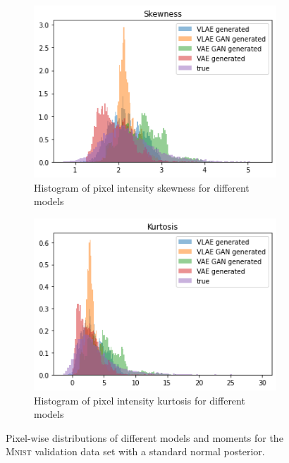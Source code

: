 \begin{figure}
    \hfill
    \begin{subfigure}{0.4\textwidth}
        \centering
        \includegraphics[width=\textwidth]{images/generated_vs_true/mnist/mnist_vs_models_skew_gauss_post.png}
        \caption{Histogram of pixel intensity skewness for different models}
        \label{subfig:skew_generated_vs_true_gauss_post}
    \end{subfigure}
    \hfill
    \begin{subfigure}{0.4\textwidth}
        \centering
        \includegraphics[width=\textwidth]{images/generated_vs_true/mnist/mnist_vs_models_kurt_gauss_post.png}
        \caption{Histogram of pixel intensity kurtosis for different models}
        \label{subfig:kurt_generated_vs_true_gauss_post}
    \end{subfigure}
    \caption[Models on \textsc{Mnist}: Pixel-wise distributions - Gaussian Posterior]{Pixel-wise distributions of different models and moments for the \textsc{Mnist} validation data set with a standard normal posterior.}
    \label{fig:mean_generated_vs_true_gauss_post}
\end{figure}

